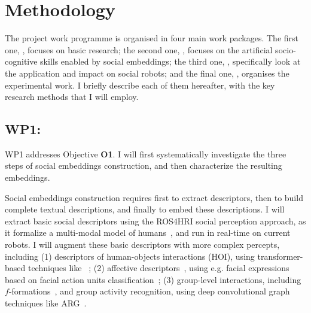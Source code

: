 %



\section{Methodology}

The \project project work programme is organised in four main work packages. The
first one, \emph{\WPA}, focuses on basic research; the second one, \emph{\WPB},
focuses on the artificial socio-cognitive skills enabled by social embeddings;
the third one, \emph{\WPC}, specifically look at the application and impact on
social robots; and the final one, \emph{\WPD}, organises the experimental work.
I briefly describe each of them hereafter, with the key research methods that I
will employ.

\subsection{WP1: \textbf{\WPA}}

WP1 addresses Objective \textbf{O1}. I will first systematically investigate the
three steps of social embeddings construction, and then characterize the
resulting embeddings.

Social embeddings construction requires first to extract descriptors, then to
build complete textual descriptions, and finally to embed these descriptions.  I
will extract basic social descriptors using the ROS4HRI social perception
approach, as it formalize a multi-modal model of humans~\cite{lemaignan2022ros},
and run in real-time on current robots. I will augment these basic descriptors
with more complex percepts, including (1) descriptors of human-objects
interactions (HOI), using transformer-based techniques
like~\cite{iftekhar2022what} ; (2) affective
descriptors~\cite{vinciarelli2009social}, using e.g. facial expressions based on
facial action units classification~\cite{martinez2019automatic}; (3) group-level
interactions, including $f$-formations~\cite{setti2015fformation}, and group
activity recognition, using deep convolutional graph techniques like
ARG~\cite{wu2019learning}.

